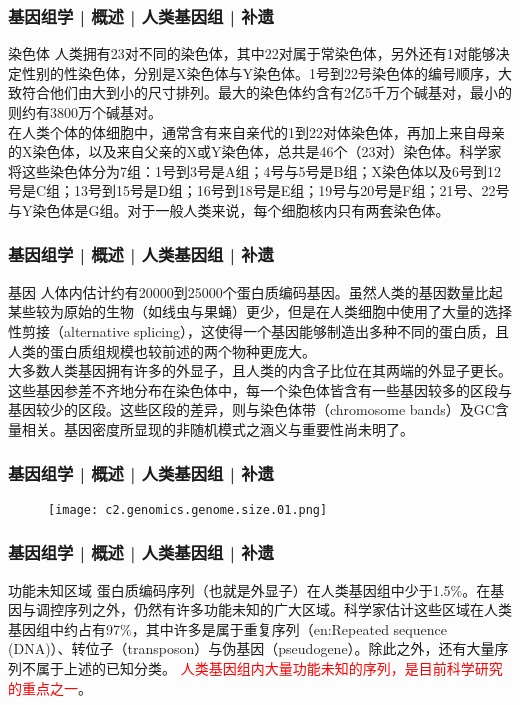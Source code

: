 \begin{frame}
  \frametitle{基因组学 | 概述 | 人类基因组 | 补遗}
  \begin{block}{染色体}
人类拥有23对不同的染色体，其中22对属于常染色体，另外还有1对能够决定性别的性染色体，分别是X染色体与Y染色体。1号到22号染色体的编号顺序，大致符合他们由大到小的尺寸排列。最大的染色体约含有2亿5千万个碱基对，最小的则约有3800万个碱基对。\\
\vspace{1em}
在人类个体的体细胞中，通常含有来自亲代的1到22对体染色体，再加上来自母亲的X染色体，以及来自父亲的X或Y染色体，总共是46个（23对）染色体。科学家将这些染色体分为7组：1号到3号是A组；4号与5号是B组；X染色体以及6号到12号是C组；13号到15号是D组；16号到18号是E组；19号与20号是F组；21号、22号与Y染色体是G组。对于一般人类来说，每个细胞核内只有两套染色体。
  \end{block}
\end{frame}

\begin{frame}
  \frametitle{基因组学 | 概述 | 人类基因组 | 补遗}
  \begin{block}{基因}
人体内估计约有20000到25000个蛋白质编码基因。虽然人类的基因数量比起某些较为原始的生物（如线虫与果蝇）更少，但是在人类细胞中使用了大量的选择性剪接（alternative splicing），这使得一个基因能够制造出多种不同的蛋白质，且人类的蛋白质组规模也较前述的两个物种更庞大。\\
\vspace{1em}
大多数人类基因拥有许多的外显子，且人类的内含子比位在其两端的外显子更长。这些基因参差不齐地分布在染色体中，每一个染色体皆含有一些基因较多的区段与基因较少的区段。这些区段的差异，则与染色体带（chromosome bands）及GC含量相关。基因密度所显现的非随机模式之涵义与重要性尚未明了。
  \end{block}
\end{frame}

\begin{frame}
  \frametitle{基因组学 | 概述 | 人类基因组 | 补遗}
  \begin{figure}
    \centering
    \texttt{[image: c2.genomics.genome.size.01.png]}
  \end{figure}
\end{frame}

\begin{frame}
  \frametitle{基因组学 | 概述 | 人类基因组 | 补遗}
  \begin{block}{功能未知区域}
    蛋白质编码序列（也就是外显子）在人类基因组中少于1.5\%。在基因与调控序列之外，仍然有许多功能未知的广大区域。科学家估计这些区域在人类基因组中约占有97\%，其中许多是属于重复序列（en:Repeated sequence (DNA)）、转位子（transposon）与伪基因（pseudogene）。除此之外，还有大量序列不属于上述的已知分类。 \textcolor{red}{人类基因组内大量功能未知的序列，是目前科学研究的重点之一}。
  \end{block}
\end{frame}

